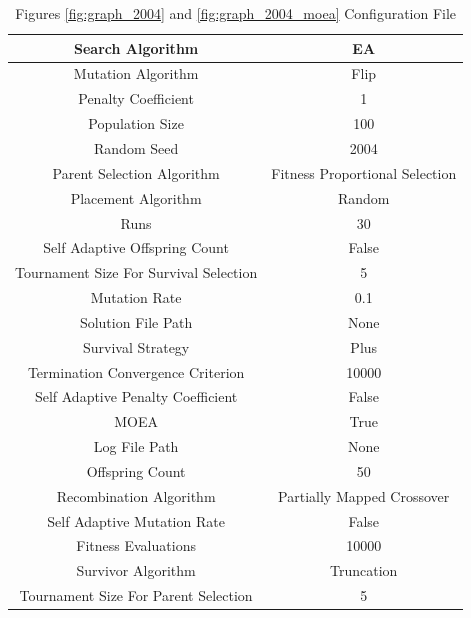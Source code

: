\documentclass{standalone}
\begin{document}
\begin{table}[!htb]
	\centering
	\caption{Figures \ref{fig:graph_2004} and \ref{fig:graph_2004_moea} Configuration File}
	\label{tab:graph_2004}
	\begin{tabular}{| c | c |}
		\hline
		Search Algorithm		& EA		 \\
		\hline
		Mutation Algorithm		& Flip		 \\
		\hline
		Penalty Coefficient		& 1		 \\
		\hline
		Population Size		& 100		 \\
		\hline
		Random Seed		& 2004		 \\
		\hline
		Parent Selection Algorithm		& Fitness Proportional Selection		 \\
		\hline
		Placement Algorithm		& Random		 \\
		\hline
		Runs		& 30		 \\
		\hline
		Self Adaptive Offspring Count		& False		 \\
		\hline
		Tournament Size For Survival Selection		& 5		 \\
		\hline
		Mutation Rate		& 0.1		 \\
		\hline
		Solution File Path		& None		 \\
		\hline
		Survival Strategy		& Plus		 \\
		\hline
		Termination Convergence Criterion		& 10000		 \\
		\hline
		Self Adaptive Penalty Coefficient		& False		 \\
		\hline
		MOEA		& True		 \\
		\hline
		Log File Path		& None		 \\
		\hline
		Offspring Count		& 50		 \\
		\hline
		Recombination Algorithm		& Partially Mapped Crossover		 \\
		\hline
		Self Adaptive Mutation Rate		& False		 \\
		\hline
		Fitness Evaluations		& 10000		 \\
		\hline
		Survivor Algorithm		& Truncation		 \\
		\hline
		Tournament Size For Parent Selection		& 5		 \\
		\hline
	\end{tabular}
\end{table}
\end{document}
